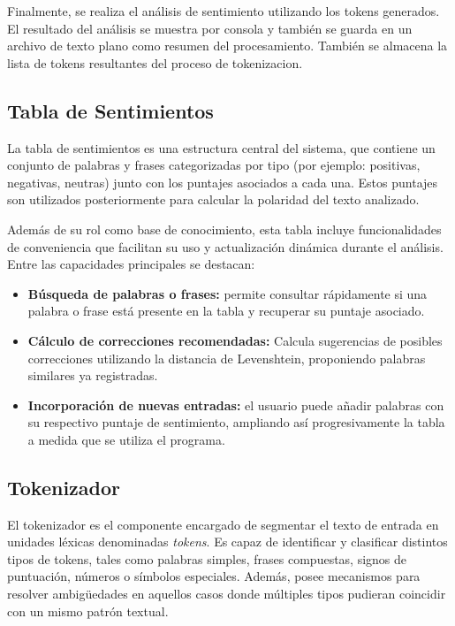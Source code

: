 Finalmente, se realiza el análisis de sentimiento utilizando los tokens generados. El resultado
del análisis se muestra por consola y también se guarda en un archivo de texto plano como
resumen del procesamiento. También se almacena la lista de tokens resultantes del proceso de
tokenizacion.

\subsection{Tabla de Sentimientos}
La tabla de sentimientos es una estructura central del sistema, que contiene un conjunto de
palabras y frases categorizadas por tipo (por ejemplo: positivas, negativas, neutras) junto con
los puntajes asociados a cada una. Estos puntajes son utilizados posteriormente para calcular
la polaridad del texto analizado.

Además de su rol como base de conocimiento, esta tabla incluye funcionalidades de conveniencia
que facilitan su uso y actualización dinámica durante el análisis. Entre las capacidades
principales se destacan:

\begin{itemize}
	\item \textbf{Búsqueda de palabras o frases:} permite consultar rápidamente si una palabra
	      o frase está presente en la tabla y recuperar su puntaje asociado.

	\item \textbf{Cálculo de correcciones recomendadas:} Calcula sugerencias de posibles
	      correcciones utilizando la distancia de Levenshtein, proponiendo palabras similares ya
	      registradas.

	\item \textbf{Incorporación de nuevas entradas:} el usuario puede añadir palabras con
	      su respectivo puntaje de sentimiento, ampliando así progresivamente la tabla a medida
	      que se utiliza el programa.
\end{itemize}

\subsection{Tokenizador}
El tokenizador es el componente encargado de segmentar el texto de entrada en unidades léxicas
denominadas \emph{tokens}. Es capaz de identificar y clasificar distintos tipos de tokens,
tales como palabras simples, frases compuestas, signos de puntuación, números o símbolos
especiales. Además, posee mecanismos para resolver ambigüedades en aquellos casos donde
múltiples tipos pudieran coincidir con un mismo patrón textual.

